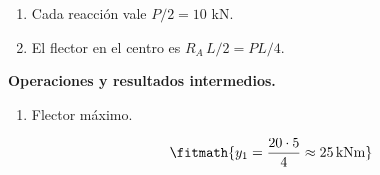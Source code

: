 \begin{enumerate}

\item Cada reacción vale $P/2 = 10$ kN.

\item El flector en el centro es $R_A\,L/2 = P L/4$.

\end{enumerate}

\noindent\textbf{Operaciones y resultados intermedios.}

\begin{enumerate}

\item Flector máximo.

\[\fitmath{y_{1}=\frac{20\cdot 5}{4}\approx 25\,\mathrm{kN m}}\]

\end{enumerate}
